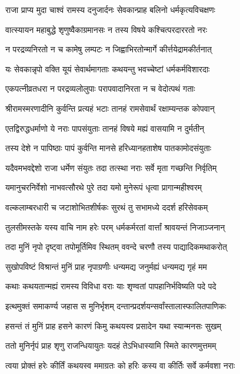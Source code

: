 \twolineshloka
{राजा प्राप्य मुदा चाश्वं रामस्य दनुजार्दनः}
{सेवकान्प्राह बलिनो धर्मकृत्यविचक्षणः}%

\twolineshloka
{वात्स्यायन महाबुद्धे शृणुष्वैकाग्रमानसः}
{न तस्य विषये कश्चित्परदाररतो नरः}%

\twolineshloka
{न परद्रव्यनिरतो न च कामेषु लम्पटः}
{न जिह्वाभिरतोन्मार्गे कीर्त्तयेद्रामकीर्तनात्}%

\twolineshloka
{यः सेवकान्नृपो वक्ति यूयं सेवार्थमागताः}
{कथयन्तु भवच्चेष्टां धर्मकर्मविशारदाः}%

\twolineshloka
{एकपत्नीव्रतधरा न परद्रव्यलोलुपाः}
{परापवादानिरता न च वेदोत्पथं गताः}%

\twolineshloka
{श्रीरामस्मरणादीनि कुर्वन्ति प्रत्यहं भटाः}
{तानहं रामसेवार्थं रक्षाम्यन्तक कोपवान्}%

\twolineshloka
{एतद्विरुद्धधर्माणो ये नराः पापसंयुताः}
{तानहं विषये मह्यं वासयामि न दुर्मतीन्}%

\twolineshloka
{तस्य देशे न पापिष्ठाः पापं कुर्वन्ति मानसे}
{हरिध्यानहताशेष पातकामोदसंयुताः}%

\twolineshloka
{यदैवमभवद्देशो राजा धर्मेण संयुतः}
{तदा तत्स्था नराः सर्वे मृता गच्छन्ति निर्वृतिम्}%

\twolineshloka
{यमानुचरनिर्वेशो नाभवत्सौरथे पुरे}
{तदा यमो मुनेरूपं धृत्वा प्रागान्महीश्वरम्}%

\twolineshloka
{वल्कलाम्बरधारी च जटाशोभितशीर्षकः}
{सुरथं तु सभामध्ये ददर्श हरिसेवकम्}%

\twolineshloka
{तुलसीमस्तके यस्य वाचि नाम हरेः परम्}
{धर्मकर्मरतां वार्त्तां श्रावयन्तं निजाञ्जनान्}%

\twolineshloka
{तदा मुनिं नृपो दृष्ट्वा तपोमूर्तिमिव स्थितम्}
{ववन्दे चरणौ तस्य पाद्यादिकमथाकरोत्}%

\twolineshloka
{सुखोपविष्टं विश्रान्तं मुनिं प्राह नृपाग्रणीः}
{धन्यमद्य जनुर्मह्यं धन्यमद्य गृहं मम}%

\twolineshloka
{कथाः कथयतान्मह्यं रामस्य विविधा वराः}
{याः शृण्वतां पापहानिर्भविष्यति पदे पदे}%

\twolineshloka
{इत्थमुक्तं समाकर्ण्य जहास स मुनिर्भृशम्}
{दन्तान्प्रदर्शयन्सर्वांस्तालास्फालितपाणिकः}%

\twolineshloka
{हसन्तं तं मुनिं प्राह हसने कारणं किमु}
{कथयस्व प्रसादेन यथा स्यान्मनसः सुखम्}%

\twolineshloka
{ततो मुनिर्नृपं प्राह शृणु राजन्धियायुतः}
{यदहं तेऽभिधास्यामि स्मिते कारणमुत्तमम्}%

\twolineshloka
{त्वया प्रोक्तं हरेः कीर्तिं कथयस्व ममाग्रतः}
{को हरिः कस्य वा कीर्तिः सर्वे कर्मवशा नराः}%

